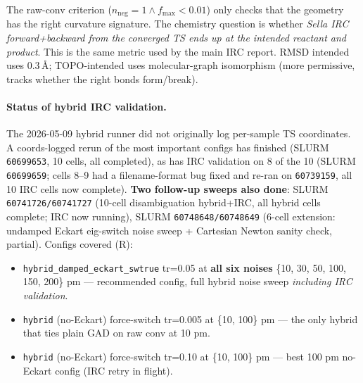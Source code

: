 \documentclass[11pt]{article}
\begin{document}
The raw-conv criterion ($n_{\text{neg}}{=}1 \wedge f_{\max}{<}0.01$) only
checks that the geometry has the right curvature signature. The chemistry
question is whether \emph{Sella IRC forward+backward from the converged TS
ends up at the intended reactant and product}. This is the same metric
used by the main IRC report. RMSD intended uses 0.3\,\AA; TOPO-intended
uses molecular-graph isomorphism (more permissive, tracks whether the
right bonds form/break).

\paragraph{Status of hybrid IRC validation.}
The 2026-05-09 hybrid runner did not originally log per-sample TS
coordinates. A coords-logged rerun of the most important configs has
finished (SLURM \texttt{60699653}, 10 cells, all completed), as has IRC
validation on 8 of the 10 (SLURM \texttt{60699659}; cells 8--9 had a
filename-format bug fixed and re-ran on \texttt{60739159}, all 10 IRC
cells now complete). \textbf{Two follow-up sweeps also done}: SLURM
\texttt{60741726/60741727} (10-cell disambiguation hybrid+IRC, all
hybrid cells complete; IRC now running), SLURM \texttt{60748648/60748649}
(6-cell extension: undamped Eckart eig-switch noise sweep + Cartesian
Newton sanity check, partial).
Configs covered (R):

\begin{itemize}[leftmargin=1.5em, itemsep=0.05em]
\item \texttt{hybrid\_damped\_eckart\_swtrue} tr=0.05 at \textbf{all six
  noises} \{10, 30, 50, 100, 150, 200\} pm --- recommended config, full
  hybrid noise sweep \emph{including IRC validation}.
\item \texttt{hybrid} (no-Eckart) force-switch tr=0.005 at
  \{10, 100\} pm --- the only hybrid that ties plain GAD on raw conv at 10 pm.
\item \texttt{hybrid} (no-Eckart) force-switch tr=0.10 at
  \{10, 100\} pm --- best 100 pm no-Eckart config (IRC retry in flight).
\end{itemize}
\end{document}
